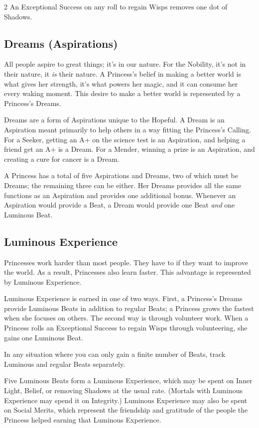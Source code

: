 \begin{multicols}{2}
An Exceptional Success on any roll to regain Wisps removes one dot of Shadows.

\subsection*{Dreams (Aspirations)}
\label{subsec:Dreams} 

All people aspire to great things; it's in our nature. For the Nobility, it's not in their nature, it \textit{is} their nature. A Princess's belief in making a better world is what gives her strength, it's what powers her magic, and it can consume her every waking moment. This desire to make a better world is represented by a Princess's Dreams. 

Dreams are a form of Aspirations unique to the Hopeful. A Dream is an Aspiration meant primarily to help others in a way fitting the Princess's Calling. For a Seeker, getting an A+ on the science test is an Aspiration, and helping a friend get an A+ is a Dream. For a Mender, winning a prize is an Aspiration, and creating a cure for cancer is a Dream. 

A Princess has a total of five Aspirations and Dreams, two of which must be Dreams; the remaining three can be either. Her Dreams provides all the same functions as an Aspiration and provides one additional bonus. Whenever an Aspiration would provide a Beat, a Dream would provide one Beat \textit{and} one Luminous Beat. 

\subsection*{Luminous Experience}
\label{subsec:LuminousExperience} 

Princesses work harder than most people. They have to if they want to improve the world. As a result, Princesses also learn faster. This advantage is represented by Luminous Experience. 

Luminous Experience is earned in one of two ways. First, a Princess's Dreams provide Luminous Beats in addition to regular Beats; a Princess grows the fastest when she focuses on others. The second way is through volunteer work. When a Princess rolls an Exceptional Success to regain Wisps through volunteering, she gains one Luminous Beat.

In any situation where you can only gain a finite number of Beats, track Luminous and regular Beats separately. 

Five Luminous Beats form a Luminous Experience, which may be spent on Inner Light, Belief, or removing Shadows at the usual rate. (Mortals with Luminous Experience may spend it on Integrity.) Luminous Experience may also be spent on Social Merits, which represent the friendship and gratitude of the people the Princess helped earning that Luminous Experience. 


\end{multicols}
